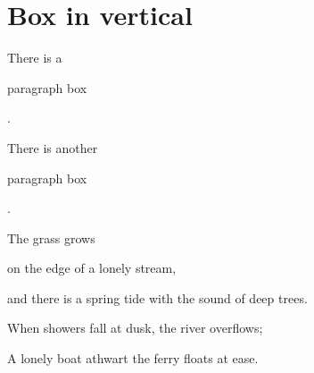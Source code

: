 \documentclass{article}
\begin{document}
    \section{Box in vertical}
        There is a \parbox{4em}{paragraph box}. \par
        There is another 
        \begin{minipage}{4em}
            paragraph box
        \end{minipage}. \par
        \begin{minipage}[c][2.5cm][t]{5em}
            The grass grows  
        \end{minipage}
        \begin{minipage}[c][2.5cm][c]{8em}
            on the edge of a lonely stream,
        \end{minipage}
        \begin{minipage}[c][2.5cm][b]{15em}
            and there is a spring tide with the sound of deep trees. 
        \end{minipage}
        \begin{minipage}[c][2.5cm][s]{14em}
            \setlength\parskip{0pt plus 1pt}
            When showers fall at dusk, the river overflows; \par
            A lonely boat athwart the ferry floats at ease.
        \end{minipage}\par
        \fbox{\usebox\verbatimbox}\quad\fbox{\usebox\verbatimbox}
        % Package fancyvrb also provides \SaveVerbatim and \UseVerbatim to do the above job. 
\end{document}
